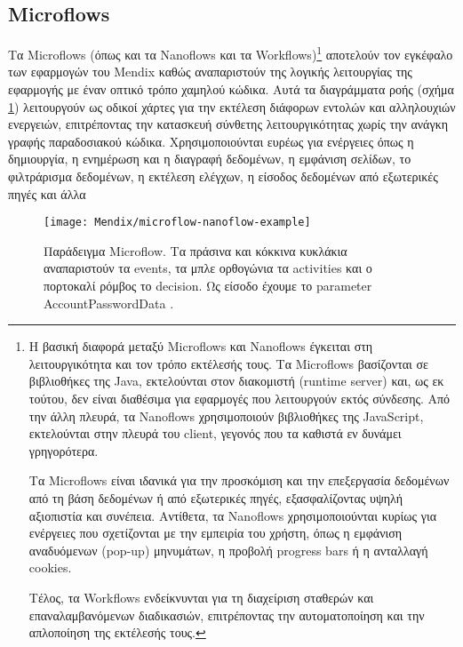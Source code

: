         \subsection{Microflows} \label{sec:MendixMicroflows}
            Τα Microflows (όπως και τα Nanoflows και τα Workflows)\footnote{Η βασική διαφορά μεταξύ Microflows και Nanoflows έγκειται στη λειτουργικότητα και τον τρόπο εκτέλεσής τους. Τα Microflows βασίζονται σε βιβλιοθήκες της Java, εκτελούνται στον διακομιστή (runtime server) και, ως εκ τούτου, δεν είναι διαθέσιμα για εφαρμογές που λειτουργούν εκτός σύνδεσης. Από την άλλη πλευρά, τα Nanoflows χρησιμοποιούν βιβλιοθήκες της JavaScript, εκτελούνται στην πλευρά του client, γεγονός που τα καθιστά εν δυνάμει γρηγορότερα.

Τα Microflows είναι ιδανικά για την προσκόμιση και την επεξεργασία δεδομένων από τη βάση δεδομένων ή από εξωτερικές πηγές, εξασφαλίζοντας υψηλή αξιοπιστία και συνέπεια. Αντίθετα, τα Nanoflows χρησιμοποιούνται κυρίως για ενέργειες που σχετίζονται με την εμπειρία του χρήστη, όπως η εμφάνιση αναδυόμενων (pop-up) μηνυμάτων, η προβολή progress bars ή η ανταλλαγή cookies.

Τέλος, τα Workflows ενδείκνυνται για τη διαχείριση σταθερών και επαναλαμβανόμενων διαδικασιών, επιτρέποντας την αυτοματοποίηση και την απλοποίηση της εκτέλεσής τους.} αποτελούν τον εγκέφαλο των εφαρμογών του Mendix καθώς αναπαριστούν της λογικής λειτουργίας της εφαρμογής με έναν οπτικό τρόπο χαμηλού κώδικα. Αυτά τα διαγράμματα ροής (σχήμα \ref{fig:MendixMicroflowExample}) λειτουργούν ως οδικοί χάρτες για την εκτέλεση διάφορων εντολών και αλληλουχιών ενεργειών, επιτρέποντας την κατασκευή σύνθετης λειτουργικότητας χωρίς την ανάγκη γραφής παραδοσιακού κώδικα. Χρησιμοποιούνται ευρέως για ενέργειες όπως η δημιουργία, η ενημέρωση και η διαγραφή δεδομένων, η εμφάνιση σελίδων, το φιλτράρισμα δεδομένων, η εκτέλεση ελέγχων, η είσοδος δεδομένων από εξωτερικές πηγές και άλλα

            \begin{figure}[h!] \noindent \centering
                \texttt{[image: Mendix/microflow-nanoflow-example]}
                \caption{\centering Παράδειγμα Microflow. Τα πράσινα και κόκκινα κυκλάκια αναπαριστούν τα events, τα μπλε ορθογώνια τα activities και ο πορτοκαλί ρόμβος το decision. Ως είσοδο έχουμε το parameter AccountPasswordData \cite{mendixDoc}.}
                \label{fig:MendixMicroflowExample}
            \end{figure}

